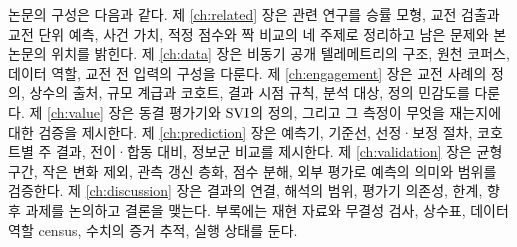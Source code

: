 논문의 구성은 다음과 같다. 제 \ref{ch:related} 장은 관련 연구를 승률 모형, 교전 검출과 교전 단위 예측, 사건 가치, 적정 점수와 짝 비교의 네 주제로 정리하고 남은 문제와 본 논문의 위치를 밝힌다. 제 \ref{ch:data} 장은 비동기 공개 텔레메트리의 구조, 원천 코퍼스, 데이터 역할, 교전 전 입력의 구성을 다룬다. 제 \ref{ch:engagement} 장은 교전 사례의 정의, 상수의 출처, 규모 계급과 코호트, 결과 시점 규칙, 분석 대상, 정의 민감도를 다룬다. 제 \ref{ch:value} 장은 동결 평가기와 $\mathrm{SVI}$의 정의, 그리고 그 측정이 무엇을 재는지에 대한 검증을 제시한다. 제 \ref{ch:prediction} 장은 예측기, 기준선, 선정·보정 절차, 코호트별 주 결과, 전이·합동 대비, 정보군 비교를 제시한다. 제 \ref{ch:validation} 장은 균형 구간, 작은 변화 제외, 관측 갱신 층화, 점수 분해, 외부 평가로 예측의 의미와 범위를 검증한다. 제 \ref{ch:discussion} 장은 결과의 연결, 해석의 범위, 평가기 의존성, 한계, 향후 과제를 논의하고 결론을 맺는다. 부록에는 재현 자료와 무결성 검사, 상수표, 데이터 역할 census, 수치의 증거 추적, 실행 상태를 둔다.
